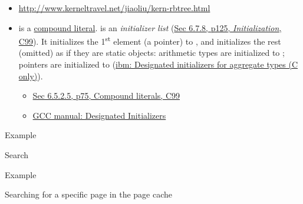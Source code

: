 \begin{itemize}
\item \url{http://www.kerneltravel.net/jiaoliu/kern-rbtree.html}
\item {} is a
  \href{http://gcc.gnu.org/onlinedocs/gcc/Compound-Literals.html}{compound
    literal}.  is an \emph{initializer list}
  (\href{http://www.open-std.org/jtc1/sc22/wg14/www/docs/n1124.pdf}{Sec 6.7.8, p125,
    \emph{Initialization}, C99}). It initializes the 1\textsuperscript{st} element (a
  pointer) to , and initializes the rest (omitted) as if they are static
  objects: arithmetic types are initialized to ; pointers are initialized to
  (\href{http://publib.boulder.ibm.com/infocenter/lnxpcomp/v8v101/index.jsp?topic=\%2Fcom.ibm.xlcpp8l.doc\%2Flanguage\%2Fref\%2Fdesignators.htm}{ibm:
    Designated initializers for aggregate types (C only)}).
  \begin{itemize}
  \item \href{http://www.open-std.org/jtc1/sc22/wg14/www/docs/n1124.pdf}{Sec 6.5.2.5, p75,
    Compound literals, C99}
  \item \href{http://gcc.gnu.org/onlinedocs/gcc/Designated-Inits.html}{GCC manual:
      Designated Initializers}
  \end{itemize}
\end{itemize}

\begin{frame}{Example}
  \begin{center}
  \end{center}
  \begin{block}{Search}
    \begin{center}
    \end{center}
  \end{block}
\end{frame}

\begin{frame}{Example}
  \begin{block}{Searching for a specific page in the page cache}
    \begin{center}
       
    \end{center}
  \end{block}
\end{frame}

